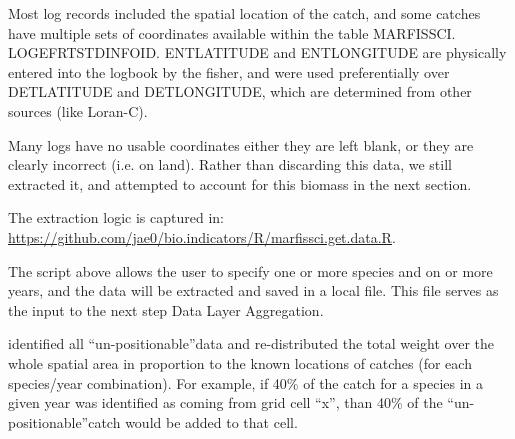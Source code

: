 \documentclass[letterpaper,portrait,11pt]{scrartcl}
\numberwithin{equation}{section}		%
\numberwithin{figure}{section}		%
\numberwithin{table}{section}				%
\begin{document}
Most log records included the spatial location of the catch, and some catches have multiple sets of coordinates available within the table MARFISSCI. LOG\textunderscore EFRT\textunderscore STD\textunderscore INFO\textunderscore ID.  ENT\textunderscore LATITUDE and ENT\textunderscore LONGITUDE are physically entered into the logbook by the fisher, and were used preferentially over DET\textunderscore LATITUDE  and DET\textunderscore LONGITUDE, which are determined from other sources (like Loran-C).  

Many logs have no usable coordinates \textendash  either they are left blank, or they are clearly incorrect (i.e. on land).  Rather than discarding this data, we still extracted it, and attempted to account for this biomass in the next section.

The extraction logic is captured in: \\
\url{https://github.com/jae0/bio.indicators/R/marfissci.get.data.R}.

The script above allows the user to specify one or more species and on or more years, and the data will be extracted and saved in a local file.  This file serves as the input to the next step \textendash Data Layer Aggregation.

identified all \textquotedblleft un-positionable\textquotedblright  data and re-distributed the total weight over the whole spatial area in proportion to the known locations of catches (for each species/year combination).  For example, if 40\% of the catch for a species in a given year was identified as coming from grid cell \textquotedblleft x\textquotedblright, than 40\% of the \textquotedblleft un-positionable\textquotedblright catch would be added to that cell. 




\end{document}
